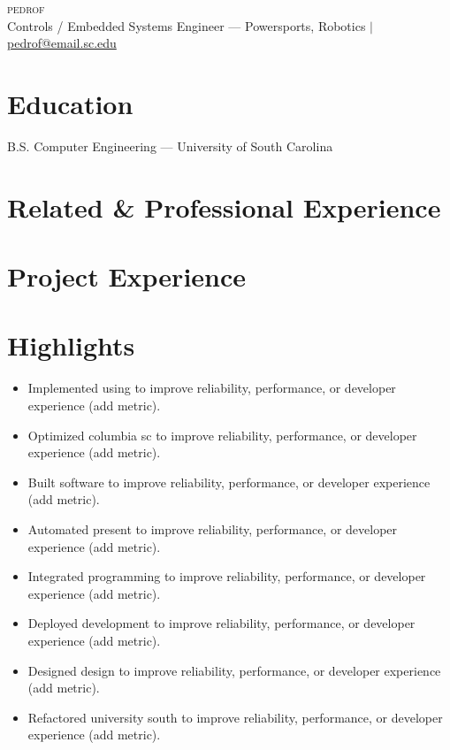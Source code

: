\documentclass[letterpaper,11pt]{article}
\begin{document}
\begin{center}
{\Huge \scshape pedrof} \\ \vspace{1pt}
Controls / Embedded Systems Engineer — Powersports, Robotics $|$ \href{mailto:pedrof@email.sc.edu}{pedrof@email.sc.edu}
\end{center}

\section{Education}

{\small B.S. Computer Engineering — University of South Carolina}\par

\section{Related \& Professional Experience}

{\small }\par

\section{Project Experience}

{\small }\par

\section{Highlights}
\begin{itemize}[leftmargin=0.15in]\item Implemented using to improve reliability, performance, or developer experience (add metric).
\item Optimized columbia sc to improve reliability, performance, or developer experience (add metric).
\item Built software to improve reliability, performance, or developer experience (add metric).
\item Automated present to improve reliability, performance, or developer experience (add metric).
\item Integrated programming to improve reliability, performance, or developer experience (add metric).
\item Deployed development to improve reliability, performance, or developer experience (add metric).
\item Designed design to improve reliability, performance, or developer experience (add metric).
\item Refactored university south to improve reliability, performance, or developer experience (add metric).\end{itemize}
\end{document}
